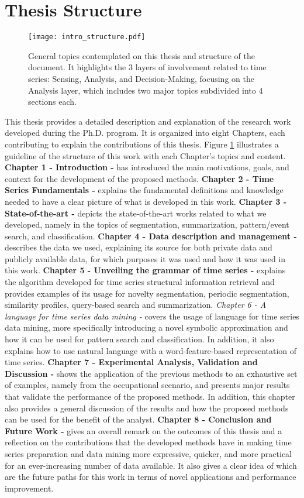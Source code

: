 \section{Thesis Structure}
\label{sec:structure}

\begin{figure}
\centering
\texttt{[image: intro\_structure.pdf]}
\caption{General topics contemplated on this thesis and structure of the document. It highlights the 3 layers of involvement related to time series: Sensing, Analysis, and Decision-Making, focusing on the Analysis layer, which includes two major topics subdivided into 4 sections each.}
\label{fig:intro}
\end{figure}

This thesis provides a detailed description and explanation of the research work developed during the Ph.D. program. It is organized into eight Chapters, each contributing to explain the contributions of this thesis. Figure \ref{fig:intro} illustrates a guideline of the structure of this work with each Chapter's topics and content. \textbf{Chapter 1 - Introduction -} has introduced the main motivations, goals, and context for the development of the proposed methods. \textbf{Chapter 2 - Time Series Fundamentals -} explains the fundamental definitions and knowledge needed to have a clear picture of what is developed in this work. \textbf{Chapter 3 - State-of-the-art -} depicts the state-of-the-art works related to what we developed, namely in the topics of segmentation, summarization, pattern/event search, and classification. \textbf{Chapter 4 - Data description and management -} describes the data we used, explaining its source for both private data and publicly available data, for which purposes it was used and how it was used in this work. \textbf{Chapter 5 - Unveiling the grammar of time series -} explains the algorithm developed for time series structural information retrieval and provides examples of its usage for novelty segmentation, periodic segmentation, similarity profiles, query-based search and summarization. \textit{Chapter 6 - A language for time series data mining -} covers the usage of language for time series data mining, more specifically introducing a novel symbolic approximation and how it can be used for pattern search and classification. In addition, it also explains how to use natural language with a word-feature-based representation of time series. \textbf{Chapter 7 - Experimental Analysis, Validation and Discussion -} shows the application of the previous methods to an exhaustive set of examples, namely from the occupational scenario, and presents major results that validate the performance of the proposed methods. In addition, this chapter also provides a general discussion of the results and how the proposed methods can be used for the benefit of the analyst. \textbf{Chapter 8 - Conclusion and Future Work -} gives an overall remark on the outcomes of this thesis and a reflection on the contributions that the developed methods have in making time series preparation and data mining more expressive, quicker, and more practical for an ever-increasing number of data available. It also gives a clear idea of which are the future paths for this work in terms of novel applications and performance improvement.

